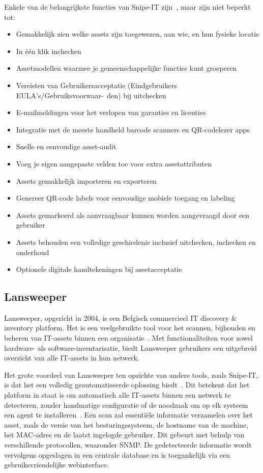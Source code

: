 Enkele van de belangrijkste functies van Snipe-IT zijn~\autocite{snipe-it-features}, maar zijn niet beperkt tot:
\begin{itemize}
    \item Gemakkelijk zien welke assets zijn toegewezen, aan wie, en hun fysieke locatie
    \item In één klik inchecken
    \item Assetmodellen waarmee je gemeenschappelijke functies kunt groeperen
    \item Vereisten van Gebruikersacceptatie (Eindgebruikers EULA's/Gebruiksvoorwaar-\ den) bij uitchecken
    \item E-mailmeldingen voor het verlopen van garanties en licenties
    \item Integratie met de meeste handheld barcode scanners en QR-codelezer apps
    \item Snelle en eenvoudige asset-audit
    \item Voeg je eigen aangepaste velden toe voor extra assetattributen
    \item Assets gemakkelijk importeren en exporteren
    \item Genereer QR-code labels voor eenvoudige mobiele toegang en labeling
    \item Assets gemarkeerd als aanvraagbaar kunnen worden aangevraagd door een gebruiker
    \item Assets behouden een volledige geschiedenis inclusief uitchecken, inchecken en onderhoud
    \item Optionele digitale handtekeningen bij assetacceptatie
\end{itemize}

\subsection{Lansweeper}
\label{sub:lansweeper}

Lansweeper, opgericht in 2004, is een Belgisch commercieel IT discovery \& inventory platform.
Het is een veelgebruikte tool voor het scannen, bijhouden en beheren van IT-assets binnen een organisatie~\autocite{lansweeper-about}.
Met functionaliteiten voor zowel hardware- als software-inventarisatie, biedt Lansweeper gebruikers een uitgebreid overzicht van alle IT-assets in hun netwerk.

Het grote voordeel van Lansweeper ten opzichte van andere tools, zoals Snipe-IT, is dat het een volledig geautomatiseerde oplossing biedt~\autocite{lansweeper-features}.
Dit betekent dat het platform in staat is om automatisch alle IT-assets binnen een netwerk te detecteren, zonder handmatige configuratie of de noodzaak om op elk systeem een agent te installeren~\autocite{lansweeper-getting-started}.
Een scan zal essenti\"ele informatie verzamelen over het asset, zoals de versie van het besturingssysteem, de hostname van de machine, het MAC-adres en de laatst ingelogde gebruiker.
Dit gebeurt met behulp van verschillende protocollen, waaronder SNMP.
De gedetecteerde informatie wordt vervolgens opgeslagen in een centrale database en is toegankelijk via een gebruiksvriendelijke webinterface.

